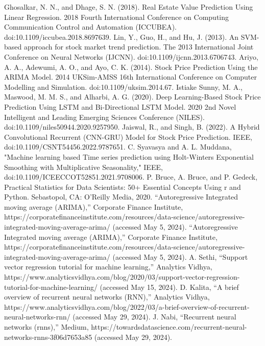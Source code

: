 \documentclass{ieeeojies}
\begin{document}
	\begin{thebibliography}{00}
		 Ghosalkar, N. N., and Dhage, S. N. (2018). Real Estate Value Prediction Using Linear Regression. 2018 Fourth International Conference on Computing Communication Control and Automation (ICCUBEA). doi:10.1109/iccubea.2018.8697639.
		 Lin, Y., Guo, H., and Hu, J. (2013). An SVM-based approach for stock market trend prediction. The 2013 International Joint Conference on Neural Networks (IJCNN). doi:10.1109/ijcnn.2013.6706743.
		 Ariyo, A. A., Adewumi, A. O., and Ayo, C. K. (2014). Stock Price Prediction Using the ARIMA Model. 2014 UKSim-AMSS 16th International Conference on Computer Modelling and Simulation. doi:10.1109/uksim.2014.67.
		 Istiake Sunny, M. A., Maswood, M. M. S., and Alharbi, A. G. (2020). Deep Learning-Based Stock Price Prediction Using LSTM and Bi-Directional LSTM Model. 2020 2nd Novel Intelligent and Leading Emerging Sciences Conference (NILES). doi:10.1109/niles50944.2020.9257950.
		 Jaiswal, R., and Singh, B. (2022). A Hybrid Convolutional Recurrent (CNN-GRU) Model for Stock Price Prediction. IEEE, doi:10.1109/CSNT54456.2022.9787651.
		 C. Syavasya and A. L. Muddana, "Machine learning based Time series prediction using Holt-Winters Exponential Smoothing with Multiplicative Seasonality," IEEE, doi:10.1109/ICEECCOT52851.2021.9708006.
		 P. Bruce, A. Bruce, and P. Gedeck, Practical Statistics for Data Scientists: 50+ Essential Concepts Using r and Python. Sebastopol, CA: O’Reilly Media, 2020. 
		 “Autoregressive Integrated moving average (ARIMA),” Corporate Finance Institute, https://corporatefinanceinstitute.com/resources/data-science/autoregressive-integrated-moving-average-arima/ (accessed May 5, 2024). 
		 “Autoregressive Integrated moving average (ARIMA),” Corporate Finance Institute, https://corporatefinanceinstitute.com/resources/data-science/autoregressive-integrated-moving-average-arima/ (accessed May 5, 2024).
		 A. Sethi, “Support vector regression tutorial for machine learning,” Analytics Vidhya, https://www.analyticsvidhya.com/blog/2020/03/support-vector-regression-tutorial-for-machine-learning/ (accessed May 15, 2024). 
		 D. Kalita, “A brief overview of recurrent neural networks (RNN),” Analytics Vidhya, https://www.analyticsvidhya.com/blog/2022/03/a-brief-overview-of-recurrent-neural-networks-rnn/ (accessed May 29, 2024). 
		 J. Nabi, “Recurrent neural networks (rnns),” Medium, https://towardsdatascience.com/recurrent-neural-networks-rnns-3f06d7653a85 (accessed May 29, 2024). 
		

\end{thebibliography}
\end{document}
